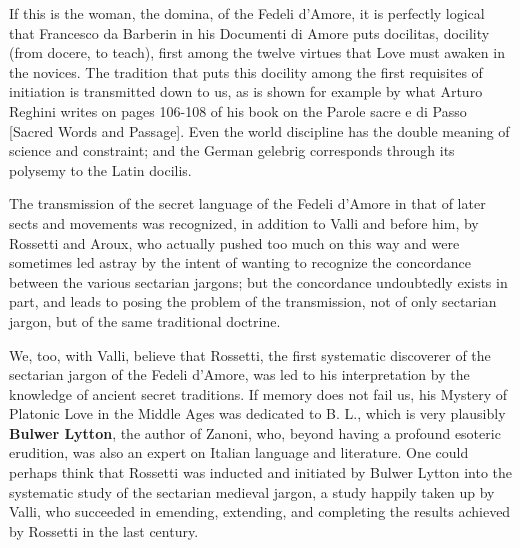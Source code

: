 If this is the woman, the domina, of the Fedeli d'Amore, it is perfectly logical that Francesco da Barberin in his Documenti di Amore puts docilitas, docility (from docere, to teach), first among the twelve virtues that Love must awaken in the novices. The tradition that puts this docility among the first requisites of initiation is transmitted down to us, as is shown for example by what Arturo Reghini writes on pages 106-108 of his book on the Parole sacre e di Passo [Sacred Words and Passage]. Even the world discipline has the double meaning of science and constraint; and the German gelebrig corresponds through its polysemy to the Latin docilis.

The transmission of the secret language of the Fedeli d'Amore in that of later sects and movements was recognized, in addition to Valli and before him, by Rossetti and Aroux, who actually pushed too much on this way and were sometimes led astray by the intent of wanting to recognize the concordance between the various sectarian jargons; but the concordance undoubtedly exists in part, and leads to posing the problem of the transmission, not of only sectarian jargon, but of the same traditional doctrine.

We, too, with Valli, believe that Rossetti, the first systematic discoverer of the sectarian jargon of the Fedeli d'Amore, was led to his interpretation by the knowledge of ancient secret traditions. If memory does not fail us, his Mystery of Platonic Love in the Middle Ages was dedicated to B. L., which is very plausibly \textbf{Bulwer Lytton}, the author of Zanoni, who, beyond having a profound esoteric erudition, was also an expert on Italian language and literature. One could perhaps think that Rossetti was inducted and initiated by Bulwer Lytton into the systematic study of the sectarian medieval jargon, a study happily taken up by Valli, who succeeded in emending, extending, and completing the results achieved by Rossetti in the last century.

